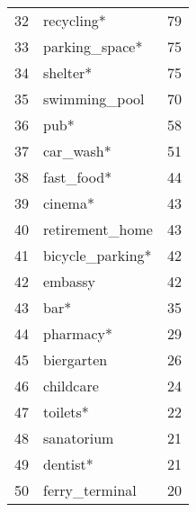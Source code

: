 \begin{tabular}{llr}
32   &         recycling* &     79 \\
33   &     parking\_space* &     75 \\
34   &           shelter* &     75 \\
35   &      swimming\_pool &     70 \\
36   &               pub* &     58 \\
37   &          car\_wash* &     51 \\
38   &         fast\_food* &     44 \\
39   &            cinema* &     43 \\
40   &    retirement\_home &     43 \\
41   &   bicycle\_parking* &     42 \\
42   &            embassy &     42 \\
43   &               bar* &     35 \\
44   &          pharmacy* &     29 \\
45   &         biergarten &     26 \\
46   &          childcare &     24 \\
47   &           toilets* &     22 \\
48   &         sanatorium &     21 \\
49   &           dentist* &     21 \\
50   &     ferry\_terminal &     20 \\
\bottomrule
\end{tabular}

